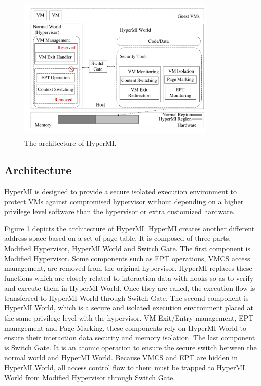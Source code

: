 \documentclass[conference]{IEEEtran}
\begin{document}
\begin{figure}
\centerline{\includegraphics[width=9.5cm, height=7cm]{pdfvmcs1.pdf}}%
\caption{The architecture of HyperMI. } \label{fig1}
\end{figure}

\subsection{Architecture} 
HyperMI is designed to provide a secure isolated execution environment to protect VMs against compromised hypervisor without depending on a higher privilege level software than the hypervisor or extra customized hardware.

Figure \ref{fig1} depicts the architecture of HyperMI. HyperMI creates another different address space based on a set of page table. It is composed of three parts, Modified Hypervisor, HyperMI World and Switch Gate. The first component is Modified Hypervisor. Some components such as EPT operations, VMCS access management, are removed from the original hypervisor. HyperMI replaces these functions which are closely related to interaction data with hooks so as to verify and execute them in HyperMI World. 
Once they are called, the execution flow is transferred to HyperMI World through Switch Gate. The second component is HyperMI World, which is a secure and isolated execution environment placed at the same privilege level with the hypervisor. VM Exit/Entry management, EPT management and Page Marking, these components rely on HyperMI World to ensure their interaction data security and memory isolation. The last component is Switch Gate. It is an atomic operation to ensure the secure switch between the normal world and HyperMI World. Because VMCS and EPT are hidden in HyperMI World, all access control flow to them must be trapped to HyperMI World from Modified Hypervisor through Switch Gate.
\end{document}
